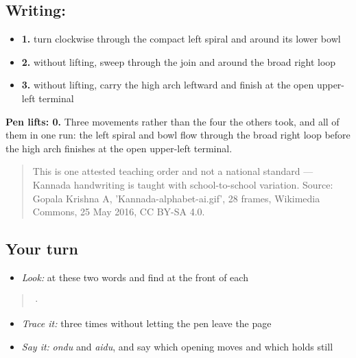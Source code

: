 \subsection*{Writing: }

\begin{itemize}
\raggedright
  \item \textbf{1.} turn clockwise through the compact left spiral and around its lower bowl
  \item \textbf{2.} without lifting, sweep through the join and around the broad right loop
  \item \textbf{3.} without lifting, carry the high arch leftward and finish at the open upper-left terminal
\end{itemize}

\textbf{Pen lifts: 0.} Three movements rather than the four the others took, and all of them in one run: the left spiral and bowl flow through the broad right loop before the high arch finishes at the open upper-left terminal.

\begin{quote}
This is one attested teaching order and not a national standard — Kannada handwriting is taught with school-to-school variation. Source: Gopala Krishna A, 'Kannada-alphabet-ai.gif', 28 frames, Wikimedia Commons, 25 May 2016, CC BY-SA 4.0.
\end{quote}

\subsection*{Your turn}
\begin{itemize}
\raggedright
  \item \emph{Look:} at these two words and find  at the front of each
\end{itemize}

\begin{quote}
  ·  
\end{quote}

\begin{itemize}
\raggedright
  \item \emph{Trace it:}  three times without letting the pen leave the page
  \item \emph{Say it:} \emph{ondu} and \emph{aidu}, and say which opening moves and which holds still
\end{itemize}

